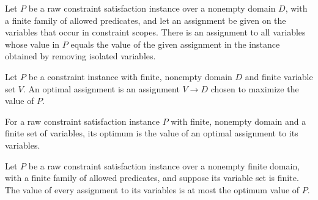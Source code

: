 \begin{theorem}
\label{FABL.RawCSPInstance.exists_raw_assignment_same_value}
\leanok
{}
Let $P$ be a raw constraint satisfaction instance over a nonempty domain $D$, with a
finite family of allowed predicates, and let an assignment be given on the variables
that occur in constraint scopes. There is an assignment to all variables whose value in
$P$ equals the value of the given assignment in the instance obtained by removing
isolated variables.
\end{theorem}

\begin{definition}
\label{FABL.RawCSPInstance.optimalAssignment}
\leanok
{}
Let $P$ be a constraint instance with finite, nonempty domain $D$ and finite variable
set $V$. An optimal assignment is an assignment $V\to D$ chosen to maximize the value
of $P$.
\end{definition}

\begin{definition}
\label{FABL.RawCSPInstance.optimum}
\leanok
{}
For a raw constraint satisfaction instance $P$ with finite, nonempty domain and a finite
set of variables, its optimum is the value of an optimal assignment to its variables.
\end{definition}

\begin{theorem}
\label{FABL.RawCSPInstance.value_le_optimum}
\leanok
{}
Let $P$ be a raw constraint satisfaction instance over a nonempty finite domain, with a
finite family of allowed predicates, and suppose its variable set is finite. The value
of every assignment to its variables is at most the optimum value of $P$.
\end{theorem}

